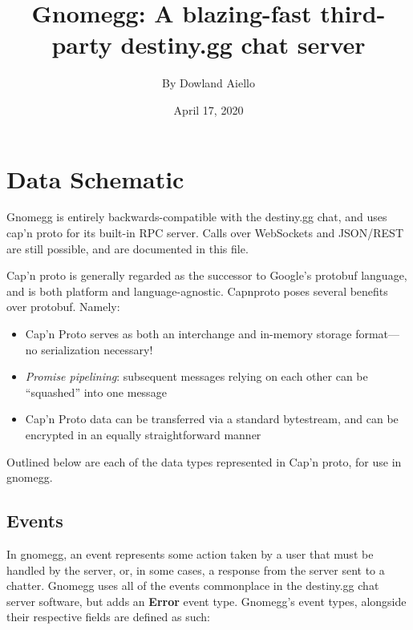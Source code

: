 \documentclass{article}
\begin{document}
\title{Gnomegg: A blazing-fast third-party destiny.gg chat server}
\author{By Dowland Aiello}
\date{April 17, 2020}

\maketitle
\tableofcontents
\fancyhf{}

\newpage

\section{Data Schematic}

Gnomegg is entirely backwards-compatible with the destiny.gg chat, and uses
cap'n proto for its built-in RPC server. Calls over WebSockets and JSON/REST are
still possible, and are documented in this file.

Cap'n proto is generally regarded as the successor to Google's
protobuf language, and is both platform and language-agnostic. Capnproto poses
several benefits over protobuf. Namely:

\begin{itemize}
	\item Cap'n Proto serves as both an interchange and in-memory storage
		format---no serialization necessary!
	\item \emph{Promise pipelining}: subsequent messages relying on each other
		can be ``squashed'' into one message
	\item Cap'n Proto data can be transferred via a standard bytestream, and can
		be encrypted in an equally straightforward manner
\end{itemize}

Outlined below are each of the data types represented in Cap'n proto, for use
in gnomegg.

\subsection{Events}

In gnomegg, an event represents some action taken by a user that must be
handled by the server, or, in some cases, a response from the server sent to a
chatter. Gnomegg uses all of the events commonplace in the destiny.gg chat server
software, but adds an \textbf{Error} event type. Gnomegg's event types,
alongside their respective fields are defined as such:
\end{document}
